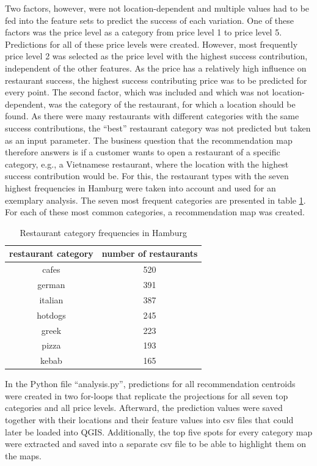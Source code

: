 \documentclass[a4paper, 11pt, oneside]{Thesis}  %
\begin{document}
Two factors, however, were not location-dependent and multiple values had to be fed into the feature sets to predict the success of each variation. One of these factors was the price level as a category from price level 1 to price level 5. Predictions for all of these price levels were created. However, most frequently price level 2 was selected as the price level with the highest success contribution, independent of the other features. As the price has a relatively high influence on restaurant success, the highest success contributing price was to be predicted for every point. The second factor, which was included and which was not location-dependent, was the category of the restaurant, for which a location should be found. As there were many restaurants with different categories with the same success contributions, the ``best'' restaurant category was not predicted but taken as an input parameter. The business question that the recommendation map therefore answers is if a customer wants to open a restaurant of a specific category, e.g., a Vietnamese restaurant, where the location with the highest success contribution would be. For this, the restaurant types with the seven highest frequencies in Hamburg were taken into account and used for an exemplary analysis. The seven most frequent categories are presented in table \ref{table:category_frequencies}. For each of these most common categories, a recommendation map was created.

\begin{table}[h!]
\begin{center}
\begin{tabular}{| c | c |}
\hline
 restaurant category & number of restaurants \\
 \hline
 cafes & 520 \\ 
 german & 391 \\  
 italian & 387 \\    
 hotdogs & 245 \\
 greek & 223 \\
 pizza & 193 \\
 kebab & 165 \\
 \hline
\end{tabular}
\caption{Restaurant category frequencies in Hamburg}
\label{table:category_frequencies}
\end{center}
\end{table}

In the Python file ``analysis.py'', predictions for all recommendation centroids were created in two for-loops that replicate the projections for all seven top categories and all price levels. Afterward, the prediction values were saved together with their locations and their feature values into \ac{csv} files that could later be loaded into QGIS. Additionally, the top five spots for every category map were extracted and saved into a separate \ac{csv} file to be able to highlight them on the maps.
\end{document}
